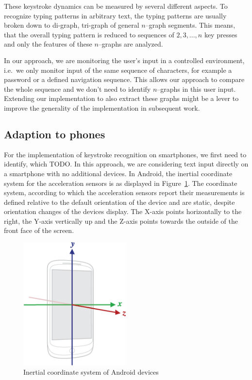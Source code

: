 These keystroke dynamics can be measured by several different aspects. To recognize typing patterns in arbitrary text, the typing patterns are usually broken down to di-graph, tri-graph of general $n$--graph segments. This means, that the overall typing pattern is reduced to sequences of $2, 3, ..., n$ key presses and only the features of these $n$--graphs are analyzed.

In our approach, we are monitoring the user's input in a controlled environment, i.e.\ we only monitor input of the same sequence of characters, for example a password or a defined navigation sequence. This allows our approach to compare the whole sequence and we don't need to identify $n$--graphs in this user input. Extending our implementation to also extract these graphs might be a lever to improve the generality of the implementation in subsequent work.

\subsection{Adaption to phones}\label{subsection:phones}
For the implementation of keystroke recognition on smartphones, we first need to identify, which TODO. In this approach, we are considering text input directly on a smartphone with no additional devices.
In Android, the inertial coordinate system for the acceleration sensors is as displayed in Figure~\ref{fig:deviceaxis}. The coordinate system, according to which the acceleration sensors report their measurements is defined relative to the default orientation of the device and are static, despite orientation changes of the devices display. The X-axis points horizontally to the right, the Y-axis vertically up and the Z-axis points towards the outside of the front face of the screen\cite{sensoreventandroidreference}.

\begin{figure}
    \centering
    \includegraphics[width=0.5\textwidth]{figures/axis_device.png}
    \caption{Inertial coordinate system of Android devices\cite{sensoreventandroidreference}}
    \label{fig:deviceaxis}
\end{figure}

